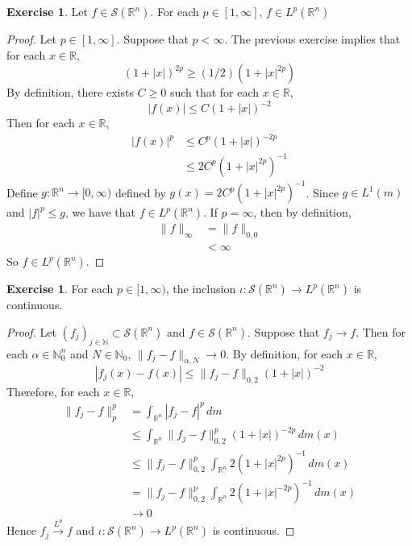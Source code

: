 \documentclass{book}
\theoremstyle{definition}
\newtheorem{ex}[definition]{Exercise}
\newcommand{\al}{\alpha}
\newcommand{\N}{\mathbb{N}}
\newcommand{\R}{\mathbb{R}}
\newcommand{\MS}{\mathcal{S}}
\DeclareMathOperator*{\0}{\mbf{0}}
\DeclareMathOperator*{\1}{\mbf{1}}
\newcommand{\conv}[1]{\xrightarrow{#1}}
\newcommand{\Rg}{[0,\infty)}
\newcommand{\dm}{\, d m}
\begin{document}
	\begin{ex}
		Let $f \in \MS(\R^n)$. For each $p \in [1, \infty]$, $f \in  L^p(\R^n)$
	\end{ex}

	\begin{proof}
		Let $p \in [1, \infty]$. Suppose that $p < \infty$. The previous exercise implies that for each $x \in \R$, 
		$$(1 + |x|)^{2p} \geq (1/2) (1 + |x|^{2p})$$
		By definition, there exists $C \geq 0$ such that for each $x \in \R$, 
		$$|f(x)| \leq C(1+|x|)^{-2} $$
		Then for each $x \in \R$,
		\begin{align*}
			|f(x)|^p 
			& \leq C^p(1+|x|)^{-2p} \\
			& \leq 2C^p(1+|x|^{2p})^{-1}
		\end{align*}
		Define $g:\R^n \rightarrow \Rg$ defined by $g(x) = 2C^{p}(1+|x|^{2p})^{-1}$. Since $g \in L^1(m)$ and $|f|^p \leq g$, we have that $f \in L^p(\R^n)$. If $p = \infty$, then by definition, 
		\begin{align*}
			\|f\|_\infty 
			& = \|f\|_{0,0} \\
			& < \infty 
		\end{align*}
		So $f \in L^p(\R^n)$. 
	\end{proof}

	\begin{ex}
		For each $p \in [1, \infty)$, the inclusion $\iota: \MS(\R^n) \rightarrow L^p(\R^n)$ is continuous. 
	\end{ex}

	\begin{proof}
		Let $(f_j)_{j \in \N} \subset \MS(\R^n)$ and $f \in \MS(\R^n)$. Suppose that $f_j \rightarrow f$. Then for each $\al \in \N_0^n$ and $N \in \N_0$, $\|f_j -f \|_{\al, N} \rightarrow 0$. By definition, for each $x \in \R$, 
		$$|f_j(x) - f(x)| \leq \|f_j - f\|_{0, 2} (1 + |x|)^{-2}$$
		Therefore, for each $x \in \R$, 
		\begin{align*}
			\|f_j - f\|_{p}^p 
			& = \int_{\R^n} |f_j - f|^p \dm \\
			& \leq \int_{\R^n} \|f_j - f\|_{0, 2}^p (1 + |x|)^{-2p} \dm(x) \\
			& \leq \|f_j - f\|_{0, 2}^p \int_{\R^n}  2(1 + |x|^{2p})^{-1} \dm(x) \\
			& = \|f_j - f\|_{0, 2}^p \int_{\R^n}  2(1 + |x|^{-2p})^{-1} \dm(x) \\
			& \rightarrow 0
		\end{align*}
		Hence $f_j \conv{L^p} f$ and $\iota: \MS(\R^n) \rightarrow L^p(\R^n)$ is continuous.
	\end{proof}
\end{document}
